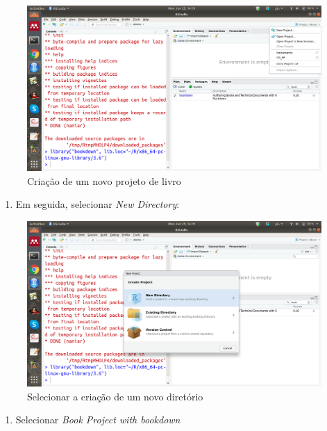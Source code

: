 \documentclass[
  oneside]{book}
\providecommand{\tightlist}{%
  \setlength{\itemsep}{0pt}\setlength{\parskip}{0pt}}
\begin{document}
\begin{figure}
\centering
\includegraphics{fig/rstudio_select_new_Project.png}
\caption{Criação de um novo projeto de livro}
\end{figure}

\begin{enumerate}
\def\labelenumi{\arabic{enumi}.}
\setcounter{enumi}{1}
\tightlist
\item
  Em seguida, selecionar \emph{New Directory}:
\end{enumerate}

\begin{figure}
\centering
\includegraphics{fig/select_new_directory.png}
\caption{Selecionar a criação de um novo diretório}
\end{figure}

\begin{enumerate}
\def\labelenumi{\arabic{enumi}.}
\setcounter{enumi}{2}
\tightlist
\item
  Selecionar \emph{Book Project with bookdown}
\end{enumerate}
\end{document}
